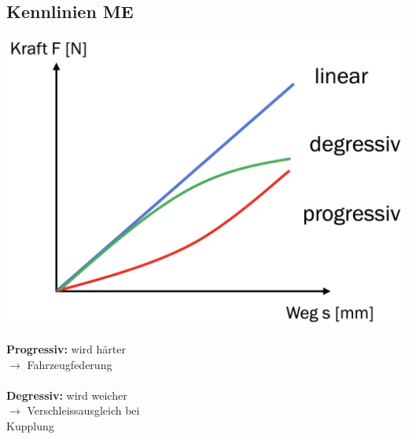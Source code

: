 \subsection{Kennlinien \hfill ME}
\begin{footnotesize}
    \begin{center}
        \begin{minipage}{0.58\linewidth}
            \includegraphics[width = 0.7\linewidth]{MAEIP_Kennlinien}
        \end{minipage}
        \begin{minipage}{0.4\linewidth}
            \textbf{Progressiv:} wird härter
            \\$\to$ Fahrzeugfederung
            \\~\\
            \textbf{Degressiv:} wird weicher
            \\$\to$ Verschleissausgleich bei\\ Kupplung
        \end{minipage}
    \end{center}
\end{footnotesize}